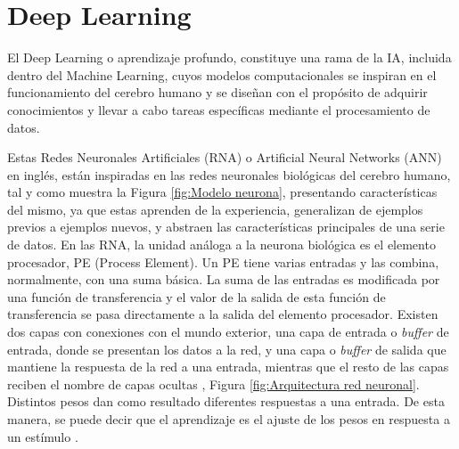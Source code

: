 \section{Deep Learning}
\label{sec:DeepLearning} 
El Deep Learning o aprendizaje profundo, constituye una rama de la IA, incluida dentro del Machine Learning, cuyos modelos computacionales se inspiran en el funcionamiento del cerebro humano y se diseñan con el propósito de adquirir conocimientos y llevar a cabo tareas específicas mediante el procesamiento de datos. %


Estas Redes Neuronales Artificiales (RNA) o Artificial Neural Networks (ANN) en inglés, están inspiradas en las redes neuronales biológicas del cerebro humano, tal y como muestra la Figura \ref{fig:Modelo neurona}, presentando características del mismo, ya que estas aprenden de la experiencia, generalizan de ejemplos previos a ejemplos nuevos, y abstraen las características principales de una serie de datos. En las RNA, la unidad análoga a la neurona biológica es el elemento procesador, PE (Process Element). Un PE tiene varias entradas y las combina, normalmente, con una suma básica. La suma de las entradas es modificada por una función de transferencia y el valor de la salida de esta función de transferencia se pasa directamente a la salida del elemento procesador. Existen dos capas con conexiones con el mundo exterior, una capa de entrada o \textit{buffer} de entrada, donde se presentan los datos a la red, y una capa o \textit{buffer} de salida que mantiene la respuesta de la red a una entrada, mientras que el resto de las capas reciben el nombre de capas ocultas \cite{Basogain08}, Figura \ref{fig:Arquitectura red neuronal}. Distintos pesos dan como resultado diferentes respuestas a una entrada. De esta manera, se puede decir que el aprendizaje es el ajuste de los pesos en respuesta a un estímulo \cite{Dinamarca18}.

